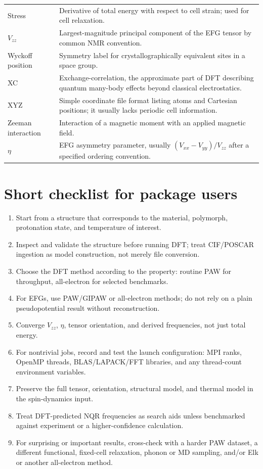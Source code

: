 \documentclass[11pt]{article}
\newcommand{\Vzz}{V_{zz}}
\newcommand{\etaEFG}{\eta}
\begin{document}
\begin{longtable}{@{}L{0.18\textwidth}L{0.76\textwidth}@{}}
Stress & Derivative of total energy with respect to cell strain; used for cell relaxation. \\
$\Vzz$ & Largest-magnitude principal component of the EFG tensor by common NMR convention. \\
Wyckoff position & Symmetry label for crystallographically equivalent sites in a space group. \\
XC & Exchange-correlation, the approximate part of DFT describing quantum many-body effects beyond classical electrostatics. \\
XYZ & Simple coordinate file format listing atoms and Cartesian positions; it usually lacks periodic cell information. \\
Zeeman interaction & Interaction of a magnetic moment with an applied magnetic field. \\
$\etaEFG$ & EFG asymmetry parameter, usually $(V_{xx}-V_{yy})/V_{zz}$ after a specified ordering convention. \\
\bottomrule
\end{longtable}

\section{Short checklist for package users}

\begin{enumerate}
\item Start from a structure that corresponds to the material, polymorph, protonation state, and temperature of interest.
\item Inspect and validate the structure before running DFT; treat CIF/POSCAR ingestion as model construction, not merely file conversion.
\item Choose the DFT method according to the property: routine PAW for throughput, all-electron for selected benchmarks.
\item For EFGs, use PAW/GIPAW or all-electron methods; do not rely on a plain pseudopotential result without reconstruction.
\item Converge $\Vzz$, $\etaEFG$, tensor orientation, and derived frequencies, not just total energy.
\item For nontrivial jobs, record and test the launch configuration: MPI ranks, OpenMP threads, BLAS/LAPACK/FFT libraries, and any thread-count environment variables.
\item Preserve the full tensor, orientation, structural model, and thermal model in the spin-dynamics input.
\item Treat DFT-predicted NQR frequencies as search aids unless benchmarked against experiment or a higher-confidence calculation.
\item For surprising or important results, cross-check with a harder PAW dataset, a different functional, fixed-cell relaxation, phonon or MD sampling, and/or Elk or another all-electron method.
\end{enumerate}
\end{document}
